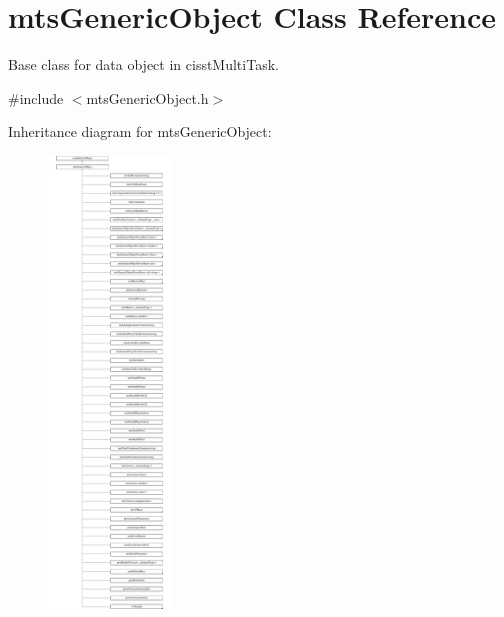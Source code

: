 \hypertarget{classmts_generic_object}{}\section{mts\+Generic\+Object Class Reference}
\label{classmts_generic_object}


Base class for data object in cisst\+Multi\+Task.  




{\ttfamily \#include $<$mts\+Generic\+Object.\+h$>$}

Inheritance diagram for mts\+Generic\+Object\+:\begin{figure}[H]
\begin{center}
\leavevmode
\includegraphics[height=12.000000cm]{d2/d5f/classmts_generic_object}
\end{center}
\end{figure}
